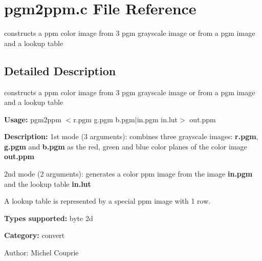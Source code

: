 \section{pgm2ppm.c File Reference}
\label{pgm2ppm_8c}
constructs a ppm color image from 3 pgm grayscale image or from a pgm image and a lookup table 



\subsection{Detailed Description}
constructs a ppm color image from 3 pgm grayscale image or from a pgm image and a lookup table 

{\bf Usage:} pgm2ppm $<$r.pgm g.pgm b.pgm$|$in.pgm in.lut$>$ out.ppm

{\bf Description:} 1st mode (3 arguments): combines three grayscale images: {\bf r.pgm}, {\bf g.pgm} and {\bf b.pgm} as the red, green and blue color planes of the color image {\bf out.ppm}

2nd mode (2 arguments): generates a color ppm image from the image {\bf in.pgm} and the lookup table {\bf in.lut}

A lookup table is represented by a special ppm image with 1 row.

{\bf Types supported:} byte 2d

{\bf Category:} convert

\begin{Desc}
\item[Author:]Michel Couprie \end{Desc}

